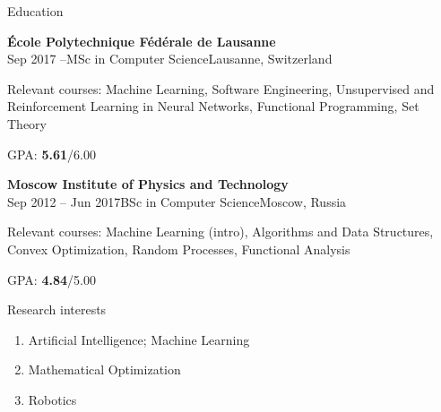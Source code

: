 \documentclass{resume} %
\begin{document}
\begin{rSection}{Education}
\begin{rSubsection}{\bf \'Ecole Polytechnique F\'ed\'erale de Lausanne}{\\Sep 2017 --}{MSc in Computer Science}{Lausanne, Switzerland}
\item Relevant courses: Machine Learning, Software Engineering, Unsupervised and Reinforcement Learning in Neural Networks, Functional Programming, Set Theory
\item GPA: {\bf 5.61}/6.00
\end{rSubsection}

\begin{rSubsection}{\bf Moscow Institute of Physics and Technology}{\\Sep 2012 -- Jun 2017}{BSc in Computer Science}{Moscow, Russia}
\item Relevant courses: Machine Learning (intro), Algorithms and Data Structures, Convex Optimization, Random Processes, Functional Analysis
\item GPA: {\bf 4.84}/5.00
\end{rSubsection}
\end{rSection}

\begin{rSection}{Research interests}
\begin{enumerate}
\item Artificial Intelligence; Machine Learning
\item Mathematical Optimization
\item Robotics
\end{enumerate}
\end{rSection}
\end{document}
